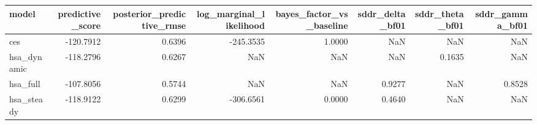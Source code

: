 \begin{tabular}{lrrrrrrr}
\toprule
model & predictive\_score & posterior\_predictive\_rmse & log\_marginal\_likelihood & bayes\_factor\_vs\_baseline & sddr\_delta\_bf01 & sddr\_theta\_bf01 & sddr\_gamma\_bf01 \\
\midrule
ces & -120.7912 & 0.6396 & -245.3535 & 1.0000 & NaN & NaN & NaN \\
hsa\_dynamic & -118.2796 & 0.6267 & NaN & NaN & NaN & 0.1635 & NaN \\
hsa\_full & -107.8056 & 0.5744 & NaN & NaN & 0.9277 & NaN & 0.8528 \\
hsa\_steady & -118.9122 & 0.6299 & -306.6561 & 0.0000 & 0.4640 & NaN & NaN \\
\bottomrule
\end{tabular}
